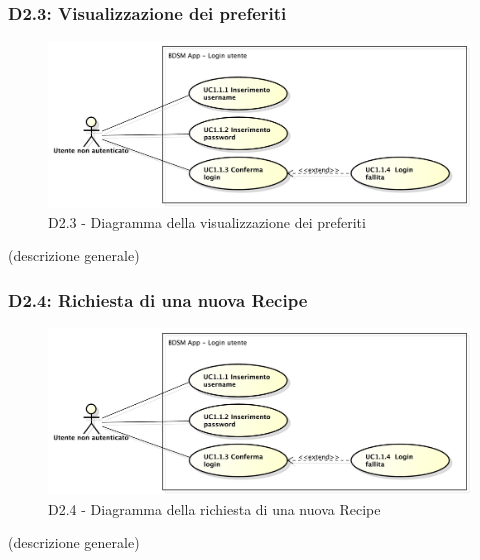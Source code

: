 		\subsubsection{D2.3: Visualizzazione dei preferiti} %
		\label{ssub:visualizzazione_dei_preferiti}
		\begin{figure}[!htbp]
			\centering
			\centerline{\includegraphics[scale=0.45]{./images/UC1_1.pdf}}
			\caption{D2.3 - Diagramma della visualizzazione dei preferiti}
		\end{figure}
		\noindent
		[TO DO] (descrizione generale)

		\subsubsection{D2.4: Richiesta di una nuova Recipe} %
		\label{ssub:richiesta_di_una_nuova_recipe}
		\begin{figure}[!htbp]
			\centering
			\centerline{\includegraphics[scale=0.45]{./images/UC1_1.pdf}}
			\caption{D2.4 - Diagramma della richiesta di una nuova Recipe}
		\end{figure}
		\noindent
		[TO DO] (descrizione generale)

